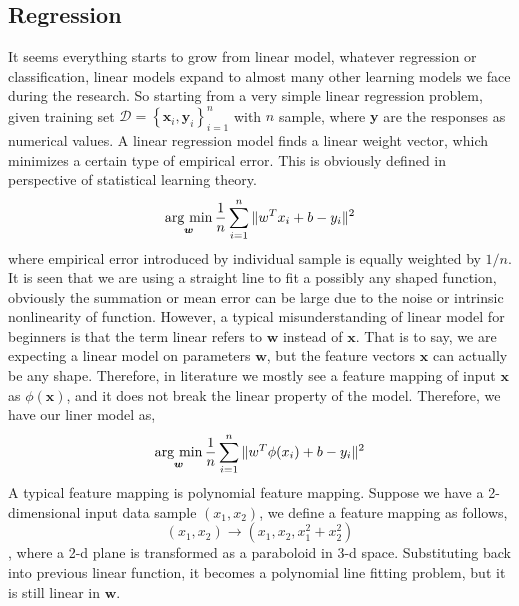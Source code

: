 \documentclass{article}
\newcommand{\vct}[1]{\ensuremath{\boldsymbol{#1}}} %
\newcommand{\set}[1]{\ensuremath{\mathcal{#1}}}
\newcommand{\argmin}{\operatornamewithlimits{\arg\,\min}}
\begin{document}
\subsection{Regression}
It seems everything starts to grow from linear model, whatever regression or classification, linear models expand to almost many other learning models we face during the research. So starting from a very simple linear regression problem, given training set $\set D = \left\{ \vct x_i, \vct y_i \right\}_{i=1}^n $ with $ n $ sample, where $ \vct y $ are the responses as numerical values. A linear regression model finds a linear weight vector, which minimizes a certain type of empirical error. This is obviously defined in perspective of statistical learning theory. 
\begin{equation}
\argmin_{\vct w} \frac{1}{n}\sum_{i=1}^n \| w^T x_i + b - y_i\|^2
\end{equation}
where empirical error introduced by individual sample is equally weighted by $ 1/n $. It is seen that we are using a straight line to fit a possibly any shaped function, obviously the summation or mean error can be large due to the noise or intrinsic nonlinearity of function. However, a typical misunderstanding of linear model for beginners is that the term linear refers to $ \vct w $ instead of $ \vct x $. That is to say, we are expecting a linear model on parameters $ \vct w $, but the feature vectors $ \vct x $ can actually be any shape. Therefore, in literature we mostly see a feature mapping of input $ \vct x $ as $ \phi(\vct x) $, and it does not break the linear property of the model. Therefore, we have our liner model as,
\begin{equation}
\argmin_{\vct w} \frac{1}{n}\sum_{i=1}^n \| w^T \phi(x_i) + b - y_i\|^2
\label{eq:linear_reg}
\end{equation}
A typical feature mapping is polynomial feature mapping. Suppose we have a 2-dimensional input data sample $ \left( x_1, x_2 \right) $, we define a feature mapping as follows,
\[ \left( x_1, x_2 \right) \rightarrow \left( x_1, x_2, x_1^2+x_2^2 \right)\], where a 2-d plane is transformed as a paraboloid in 3-d space. Substituting back into previous linear function, it becomes a polynomial line fitting problem, but it is still linear in $ \vct w $.
\end{document}
